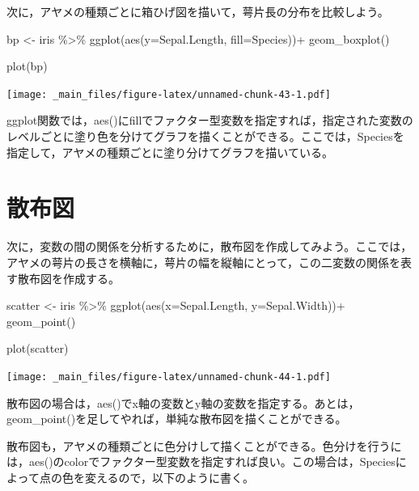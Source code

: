 \documentclass[
]{book}
\newenvironment{Shaded}{\begin{snugshade}}{\end{snugshade}}
\newcommand{\AttributeTok}[1]{\textcolor[rgb]{0.77,0.63,0.00}{#1}}
\newcommand{\FunctionTok}[1]{\textcolor[rgb]{0.00,0.00,0.00}{#1}}
\newcommand{\NormalTok}[1]{#1}
\newcommand{\OtherTok}[1]{\textcolor[rgb]{0.56,0.35,0.01}{#1}}
\newcommand{\SpecialCharTok}[1]{\textcolor[rgb]{0.00,0.00,0.00}{#1}}
\begin{document}
次に，アヤメの種類ごとに箱ひげ図を描いて，萼片長の分布を比較しよう。

\begin{Shaded}
\begin{Highlighting}[]
\NormalTok{bp }\OtherTok{\textless{}{-}}\NormalTok{ iris }\SpecialCharTok{\%\textgreater{}\%} 
  \FunctionTok{ggplot}\NormalTok{(}\FunctionTok{aes}\NormalTok{(}\AttributeTok{y=}\NormalTok{Sepal.Length, }\AttributeTok{fill=}\NormalTok{Species))}\SpecialCharTok{+}
  \FunctionTok{geom\_boxplot}\NormalTok{()}

\FunctionTok{plot}\NormalTok{(bp)}
\end{Highlighting}
\end{Shaded}

\texttt{[image: \_main\_files/figure-latex/unnamed-chunk-43-1.pdf]}

ggplot関数では，aes()にfillでファクター型変数を指定すれば，指定された変数のレベルごとに塗り色を分けてグラフを描くことができる。ここでは，Speciesを指定して，アヤメの種類ごとに塗り分けてグラフを描いている。

\hypertarget{ux6563ux5e03ux56f3}{%
\section{散布図}\label{ux6563ux5e03ux56f3}}

次に，変数の間の関係を分析するために，散布図を作成してみよう。ここでは，アヤメの萼片の長さを横軸に，萼片の幅を縦軸にとって，この二変数の関係を表す散布図を作成する。

\begin{Shaded}
\begin{Highlighting}[]
\NormalTok{scatter }\OtherTok{\textless{}{-}}\NormalTok{ iris }\SpecialCharTok{\%\textgreater{}\%} 
  \FunctionTok{ggplot}\NormalTok{(}\FunctionTok{aes}\NormalTok{(}\AttributeTok{x=}\NormalTok{Sepal.Length, }\AttributeTok{y=}\NormalTok{Sepal.Width))}\SpecialCharTok{+}
  \FunctionTok{geom\_point}\NormalTok{()}

\FunctionTok{plot}\NormalTok{(scatter)}
\end{Highlighting}
\end{Shaded}

\texttt{[image: \_main\_files/figure-latex/unnamed-chunk-44-1.pdf]}

散布図の場合は，aes()でx軸の変数とy軸の変数を指定する。あとは，geom\_point()を足してやれば，単純な散布図を描くことができる。

散布図も，アヤメの種類ごとに色分けして描くことができる。色分けを行うには，aes()のcolorでファクター型変数を指定すれば良い。この場合は，Speciesによって点の色を変えるので，以下のように書く。
\end{document}
